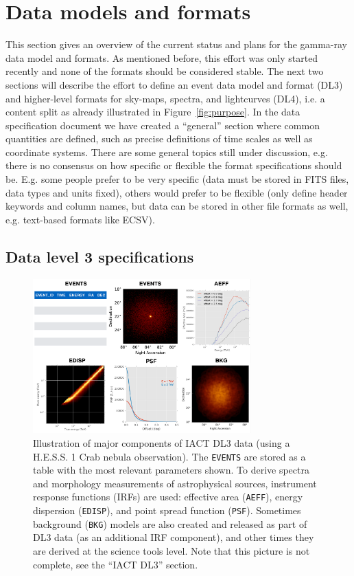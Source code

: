 \section{Data models and formats}

This section gives an overview of the current status and plans for the gamma-ray data model and formats. As mentioned before, this effort was only started recently and none of the formats should be considered stable. The next two sections will describe the effort to define an event data model and format (DL3) and higher-level formats for sky-maps, spectra, and lightcurves (DL4), i.e. a content split as already illustrated in Figure~\ref{fig:purpose}.
In the data specification document we have created a ``general'' section where common quantities are defined, such as precise definitions of time scales as well as coordinate systems. 
%
There are some general topics still under discussion, e.g. there is no consensus on how specific or flexible the format specifications should be. E.g. some people prefer to be very specific (data must be stored in FITS files, data types and units fixed), others would prefer to be flexible (only define header keywords and column names, but data can be stored in other file formats as well, e.g. text-based formats like ECSV).

\subsection{Data level 3 specifications}

\begin{figure}[tb]
\centerline{\includegraphics[width=0.75\textwidth]{figures/iact-dl3}}
\caption{
Illustration of major components of IACT DL3 data (using a H.E.S.S. 1 Crab nebula observation). The \texttt{EVENTS} are stored as a table with the most relevant parameters shown. To derive spectra and morphology measurements of astrophysical sources, instrument response functions (IRFs) are used: effective area (\texttt{AEFF}), energy dispersion (\texttt{EDISP}), and point spread function (\texttt{PSF}). Sometimes background (\texttt{BKG}) models are also created and released as part of DL3 data (as an additional IRF component), and other times they are derived at the science tools level. Note that this picture is not complete, see the ``IACT DL3'' section.
}
\label{fig:iact-dl3}
\end{figure}

